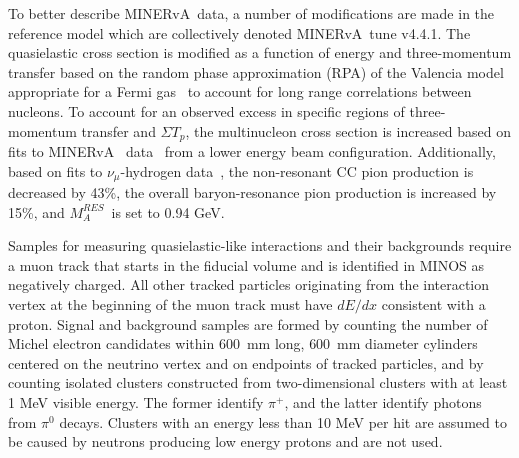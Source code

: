 \documentclass[aps,prl,twocolumn,showpacs,superscriptaddress, floatfix]{revtex4-2}  %
\newcommand{\minerva}{MINERvA}
\newcommand{\tune}{\minerva~tune v4.4.1}
\newcommand{\sumtp}{\ensuremath{\Sigma T_{p}}}
\begin{document}
To better describe \minerva~data, a number of modifications are made in the reference model which are collectively denoted \tune.   The quasielastic cross section is modified as a function of energy and three-momentum transfer based on the random phase approximation (RPA) of the Valencia model~\cite{Nieves:2004wx,Gran:2017psn} appropriate for a Fermi gas~\cite{Martini:2016eec,Nieves:2017lij} to account for long range correlations between nucleons. To account for an observed excess in specific regions of three-momentum transfer and \sumtp , the multinucleon cross section is increased based on fits to \minerva~ data~\cite{Rodrigues:2015hik} from a lower energy beam configuration.  Additionally, based on fits to $\nu_{\mu}$-hydrogen data~\cite{Rodrigues:2016xjj}, the non-resonant CC pion production is decreased by 43\%, the overall baryon-resonance pion production is increased by 15\%, and $M_{A}^{RES}$~is set to 0.94 GeV.





Samples for measuring quasielastic-like interactions and their backgrounds require a muon track that starts in the fiducial volume and is identified in MINOS as negatively charged.  All other tracked particles originating from the interaction vertex at the beginning of the muon track must have $dE/dx$ consistent with a proton.  
Signal and background samples are formed by counting the number of Michel electron candidates within $600$~mm long, $600$~mm diameter cylinders centered on the neutrino vertex and on endpoints of tracked particles, and by counting isolated clusters constructed from two-dimensional clusters with at least 1 MeV visible energy. The former identify $\pi^+$, and the latter identify photons from $\pi^0$ decays. Clusters with an energy less than 10 MeV per hit are assumed to
be caused by neutrons producing low energy protons and are not used.
\end{document}
